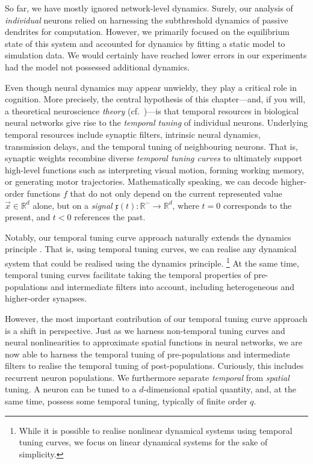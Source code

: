 
So far, we have mostly ignored network-level dynamics.
Surely, our analysis of \emph{individual} \nlif neurons relied on harnessing the subthreshold dynamics of passive dendrites for computation.
However, we primarily focused on the equilibrium state of this system and accounted for dynamics by fitting a static model to simulation data.
We would certainly have reached lower errors in our experiments had the model not possessed additional dynamics.

Even though neural dynamics may appear unwieldy, they play a critical role in cognition.
More precisely, the central hypothesis of this chapter---and, if you will, a theoretical neuroscience \emph{theory} (cf.~)---is that temporal resources in biological neural networks give rise to the \emph{temporal tuning} of individual neurons.
Underlying temporal resources include synaptic filters, intrinsic neural dynamics, transmission delays, and the temporal tuning of neighbouring neurons.
That is, synaptic weights recombine diverse \emph{temporal tuning curves} to ultimately support high-level functions such as interpreting visual motion, forming working memory, or generating motor trajectories.
Mathematically speaking, we can decode higher-order functions $f$ that do not only depend on the current represented value $\vec x \in \mathbb{R}^d$ alone, but on a \emph{signal} $\mathfrak{x}(t) : \mathbb{R}^- \longrightarrow \mathbb{R}^d$, where $t = 0$ corresponds to the present, and $t < 0$ references the past.

Notably, our temporal tuning curve approach naturally extends the \NEF dynamics principle \citep[Chapter~8]{eliasmith2003neural}.
That is, using temporal tuning curves, we can realise any dynamical system that could be realised using the dynamics principle.%
\footnote{While it is possible to realise nonlinear dynamical systems using temporal tuning curves, we focus on linear dynamical systems for the sake of simplicity.}
At the same time, temporal tuning curves facilitate taking the temporal properties of pre-populations and intermediate filters into account, including heterogeneous and higher-order synapses.

However, the most important contribution of our temporal tuning curve approach is a shift in perspective.
Just as we harness non-temporal tuning curves and neural nonlinearities to approximate spatial functions in neural networks, we are now able to harness the temporal tuning of pre-populations and intermediate filters to realise the temporal tuning of post-populations.
Curiously, this includes recurrent neuron populations.
We furthermore separate \emph{temporal} from \emph{spatial} tuning.
A neuron can be tuned to a $d$-dimensional spatial quantity, and, at the same time, possess some temporal tuning, typically of finite order $q$.

